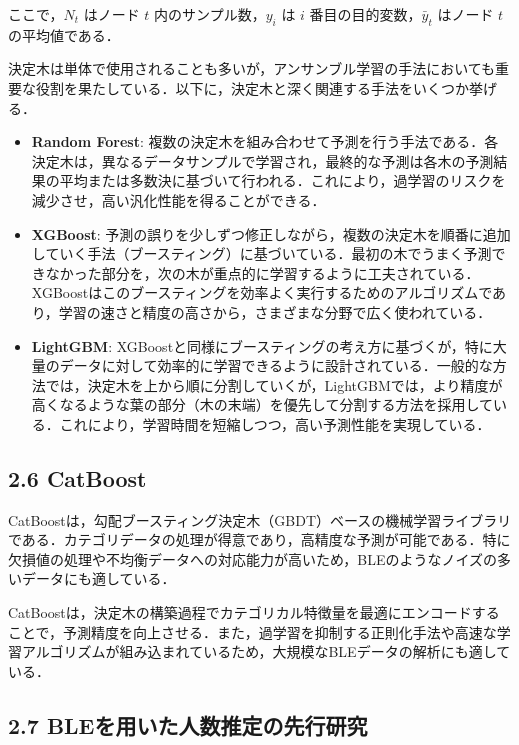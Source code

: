 ここで，$N_t$ はノード $t$ 内のサンプル数，$y_i$ は $i$ 番目の目的変数，$\bar{y}_t$ はノード $t$ の平均値である．


決定木は単体で使用されることも多いが，アンサンブル学習の手法においても重要な役割を果たしている．以下に，決定木と深く関連する手法をいくつか挙げる．

\begin{itemize}
	\item \textbf{Random Forest}: 
	複数の決定木を組み合わせて予測を行う手法である．各決定木は，異なるデータサンプルで学習され，最終的な予測は各木の予測結果の平均または多数決に基づいて行われる．これにより，過学習のリスクを減少させ，高い汎化性能を得ることができる．
	
	\item \textbf{XGBoost}:
	予測の誤りを少しずつ修正しながら，複数の決定木を順番に追加していく手法（ブースティング）に基づいている．最初の木でうまく予測できなかった部分を，次の木が重点的に学習するように工夫されている．XGBoostはこのブースティングを効率よく実行するためのアルゴリズムであり，学習の速さと精度の高さから，さまざまな分野で広く使われている．
	
	\item \textbf{LightGBM}:
	XGBoostと同様にブースティングの考え方に基づくが，特に大量のデータに対して効率的に学習できるように設計されている．一般的な方法では，決定木を上から順に分割していくが，LightGBMでは，より精度が高くなるような葉の部分（木の末端）を優先して分割する方法を採用している．これにより，学習時間を短縮しつつ，高い予測性能を実現している．
\end{itemize}

\subsection*{2.6 CatBoost}
CatBoostは，勾配ブースティング決定木（GBDT）ベースの機械学習ライブラリである．カテゴリデータの処理が得意であり，高精度な予測が可能である．特に欠損値の処理や不均衡データへの対応能力が高いため，BLEのようなノイズの多いデータにも適している．

CatBoostは，決定木の構築過程でカテゴリカル特徴量を最適にエンコードすることで，予測精度を向上させる．また，過学習を抑制する正則化手法や高速な学習アルゴリズムが組み込まれているため，大規模なBLEデータの解析にも適している．

\subsection*{2.7 BLEを用いた人数推定の先行研究}

